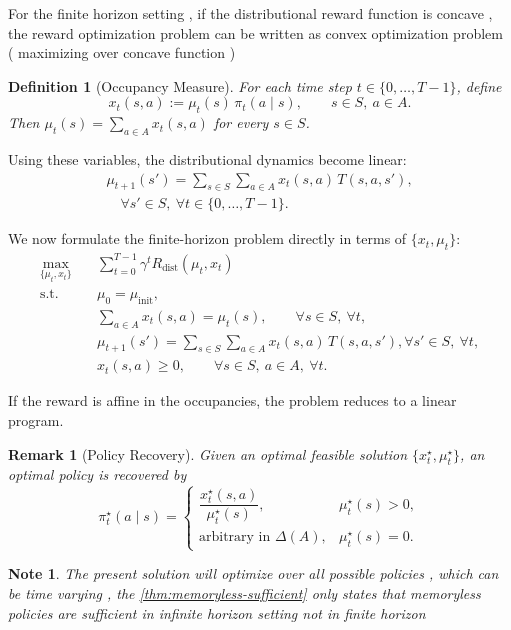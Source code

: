 \documentclass{article}
\newtheorem{definition}{Definition}
\newtheorem{remark}{Remark}
\newtheorem{note}{Note}
\begin{document}
For the finite horizon setting , if the distributional reward function is concave , the reward optimization problem can be written as convex optimization problem ( maximizing over concave function ) 

\begin{definition}[Occupancy Measure]
For each time step $t \in \{0,\dots,T-1\}$, define
\[
x_t(s,a) := \mu_t(s)\,\pi_t(a\mid s), \qquad s \in S,\ a \in A.
\]
Then $\mu_t(s) = \sum_{a \in A} x_t(s,a)$ for every $s \in S$.
\end{definition}

Using these variables, the distributional dynamics become linear:
\[
\begin{aligned}
    \mu_{t+1}(s') = \sum_{s \in S}\sum_{a \in A} x_t(s,a)\,T(s,a,s'), \\
    \quad \forall s' \in S,\ \forall t \in \{0,\dots,T-1\}.
\end{aligned}
\]

We now formulate the finite-horizon problem directly in terms of $\{x_t,\mu_t\}$:
\[
\begin{aligned}
\max_{\{\mu_t,x_t\}} \quad &
\sum_{t=0}^{T-1} \gamma^t R_{\mathrm{dist}}(\mu_t,x_t) \\
\text{s.t.}\quad
& \mu_0 = \mu_{\mathrm{init}}, \\
& \sum_{a \in A} x_t(s,a) = \mu_t(s), \qquad \forall s \in S,\ \forall t, \\
& \mu_{t+1}(s') = \sum_{s \in S}\sum_{a \in A} x_t(s,a)\,T(s,a,s'),  \forall s' \in S,\ \forall t, \\
& x_t(s,a) \ge 0, \qquad \forall s \in S,\ a \in A,\ \forall t.
\end{aligned}
\]

 If the reward is affine in the occupancies, the problem reduces to a linear program.


 

\begin{remark}[Policy Recovery]
Given an optimal feasible solution $\{x_t^\star,\mu_t^\star\}$, an optimal policy is recovered by
\[
\pi_t^\star(a\mid s)=
\begin{cases}
\dfrac{x_t^\star(s,a)}{\mu_t^\star(s)}, & \mu_t^\star(s)>0,\\[1.2ex]
\text{arbitrary in }\Delta(A), & \mu_t^\star(s)=0.
\end{cases}
\]
\end{remark}


\begin{note}
    The present solution will optimize over all possible policies , which can be time varying , the \ref{thm:memoryless-sufficient} only states that memoryless policies are sufficient in infinite horizon setting not in finite horizon 
\end{note}
\end{document}
